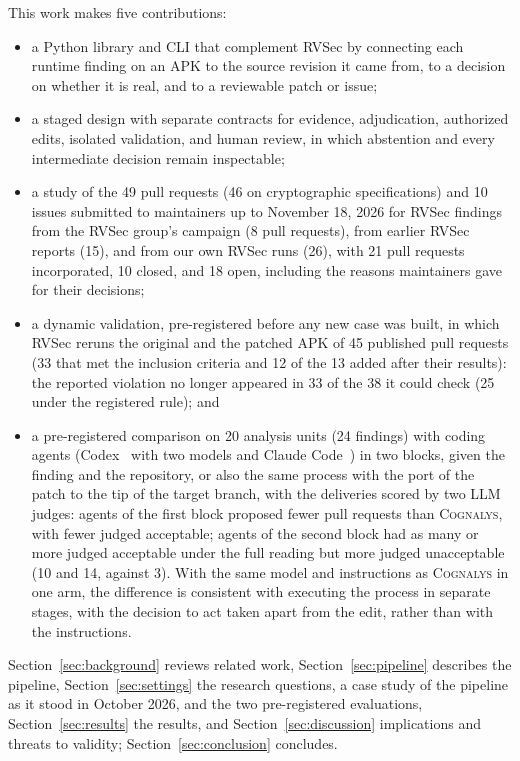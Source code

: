 \documentclass[conference]{IEEEtran}
\newcommand{\system}{\textsc{Cognalys}}
\begin{document}
This work makes five contributions:
\begin{itemize}
  \item a Python library and CLI that complement RVSec by connecting each
  runtime finding on an APK to the source revision it came from, to a decision
  on whether it is real, and to a reviewable patch or issue;
  \item a staged design with separate contracts for evidence, adjudication,
  authorized edits, isolated validation, and human review, in which abstention
  and every intermediate decision remain inspectable;
  \item a study of the 49 pull requests (46 on cryptographic specifications)
  and 10 issues submitted to maintainers up to November 18, 2026 for RVSec
  findings from the RVSec group's campaign (8 pull requests), from earlier RVSec
  reports (15), and from our own RVSec runs (26), with 21 pull requests
  incorporated, 10 closed, and 18 open, including the reasons maintainers gave
  for their decisions;
  \item a dynamic validation, pre-registered before any new case was built, in
  which RVSec reruns the original and the patched APK of 45 published pull
  requests (33 that met the inclusion criteria and 12 of the 13 added after
  their results): the reported violation no longer appeared in 33 of the 38 it
  could check (25 under the registered rule); and
  \item a pre-registered comparison on 20 analysis units (24 findings) with
  coding agents (Codex~\cite{openai2026codex}
  with two models and Claude Code~\cite{anthropic2026claudecode}) in two blocks, given the finding and the
  repository, or also the same process with the port of the patch to the tip of
  the target branch, with the deliveries scored by two LLM judges: agents of the
  first block proposed fewer pull requests than \system{}, with fewer judged
  acceptable; agents of the second block had as many or more judged acceptable
  under the full reading but more judged unacceptable (10 and 14, against 3). With the same model and
  instructions as \system{} in one arm, the difference is consistent with
  executing the process in separate stages, with the decision to act taken
  apart from the edit, rather than with the instructions.
\end{itemize}

Section~\ref{sec:background} reviews related work,
Section~\ref{sec:pipeline} describes the pipeline, Section~\ref{sec:settings}
the research questions, a case study of the pipeline as it stood in October
2026, and the two pre-registered evaluations, Section~\ref{sec:results} the
results, and Section~\ref{sec:discussion} implications and threats to
validity; Section~\ref{sec:conclusion} concludes.
\end{document}
